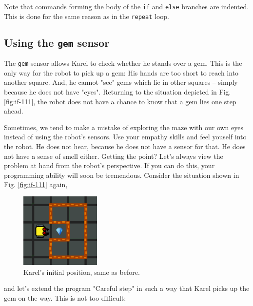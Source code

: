 \begin{gbox}
\begin{center}
Note that commands forming the body of the {\tt if} and {\tt else} branches are indented.
This is done for the same reason as in the {\tt repeat} loop. 
\end{center}
\end{gbox}


\subsection{Using the {\tt gem} sensor}

The {\tt gem} sensor allows Karel to check whether he stands over a gem. 
This is the only way for the robot to pick up a gem: His hands are 
too short to reach into another square. And, he cannot "see" gems which 
lie in other squares -- simply because he does not have "eyes". Returning to 
the situation depicted in Fig. \ref{fig:if-111}, the robot does not have 
a chance to know that a gem lies one step ahead. 

Sometimes, we tend to make 
a mistake of exploring the maze with our own eyes instead of using the 
robot's sensors. Use your empathy skills and feel youself into the robot. 
He does not hear, because he does not have a sensor for that. He does not 
have a sense of smell either. Getting the point? Let's always view the 
problem at hand from the robot's perspective. If you can do this, your 
programming ability will soon be tremendous.
Consider the situation shown in Fig. \ref{fig:if-111} again,

\begin{figure}[!ht]
\begin{center}
\includegraphics[width=4cm]{img/if-111.png}
\vspace{-0mm}
\caption{Karel's initial position, same as before.}
\label{fig:if-111b}
\vspace{-6mm}
\end{center}
\end{figure}
\noindent
and let's extend 
the program "Careful step" in such a way that Karel picks up the gem on
the way. This is not too difficult:\\

